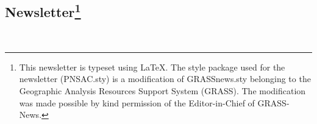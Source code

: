 \address{Paul Labranche\\
Treasurer\\
}

  
\subsection{Newsletter\protect\footnote{This newsletter is typeset using
    \LaTeX.  The style package used for the newsletter (PNSAC.sty) is
    a modification of GRASSnews.sty belonging to the Geographic
    Analysis Resources Support System (GRASS). The modification was
    made possible by kind permission of the Editor-in-Chief of
    GRASS-News.}}

\small\address{Editor: Roger Button\\
\small{}}

\address{Typesetter: Drew Hodge}









\address{PNSAC\\
P.O.Box 44005\\
Ottawa, ON\\
K1K 4P8}\\

